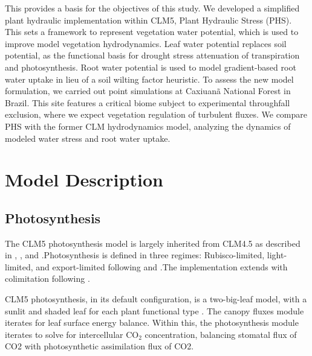 \documentclass[draft,linenumbers]{agujournal}
\begin{document}
This provides a basis for the objectives of this study.
We developed a simplified plant hydraulic implementation within CLM5, Plant Hydraulic Stress (PHS).
This sets a framework to represent vegetation water potential, which is used to improve model vegetation hydrodynamics.
Leaf water potential replaces soil potential, as the functional basis for drought stress attenuation of transpiration and photosynthesis.
Root water potential is used to model gradient-based root water uptake in lieu of a soil wilting factor heuristic.
To assess the new model formulation, we carried out point simulations at Caxiuan\~a National Forest in Brazil.
This site features a critical biome subject to experimental throughfall exclusion, where we expect vegetation regulation of turbulent fluxes.
We compare PHS with the former CLM hydrodynamics model, analyzing the dynamics of modeled water stress and root water uptake.

\section{Model Description}

\subsection{Photosynthesis}
\label{sect:A}
    The CLM5 photosynthesis model is largely inherited from CLM4.5 as described in \citet{bonan2011}, \citet{thornton2007},
    and \citet{oleson2013}.Photosynthesis is defined in three regimes: Rubisco-limited, light-limited, and export-limited 
    following \citet{farquhar1980} and \citet{harley1992}.The implementation extends \citet{sellers1996a,sellers1996b} with 
    colimitation following \citet{collatz1991}. 
    
    CLM5 photosynthesis, in its default configuration, is a two-big-leaf model, with a sunlit and shaded leaf for each plant functional type \citep{thornton2007, dai2004, oleson2013}. 
    The canopy fluxes module iterates for leaf surface energy balance.
    Within this, the photosynthesis module iterates to solve for intercellular CO$_2$ concentration, balancing stomatal flux of 
    CO2 with photosynthetic assimilation flux of CO2.
    
\end{document}
